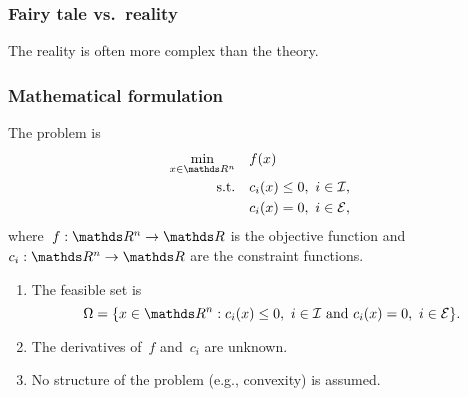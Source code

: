 \documentclass{polyu-presentation}
\newcommand{\con}[1]{c_{#1}}
\newcommand{\ieq}{\mathcal{E}}
\newcommand{\iub}{\mathcal{I}}
\newcommand{\obj}{f}
\begin{document}
\begin{frame}
    \frametitle{Fairy tale vs.\ reality}

    \alert<2>{The reality} is often more complex than \alert<1>{the theory}.

    \bigskip
    
    \begin{center}
    \end{center}
\end{frame}

\begin{frame}
    \frametitle{Mathematical formulation}

    The problem is
    \begin{align*}
        \min_{x \in \R^n}   & \quad \obj(x)\\
        \text{s.t.}         & \quad \con{i}(x) \le 0, ~ i \in \iub,\\
                            & \quad \con{i}(x) = 0, ~ i \in \ieq,
    \end{align*}
    where~$\obj : \R^n \to \R$ is the \alert{objective function} and~$\con{i} : \R^n \to \R$ are the \alert{constraint functions}.

    \smallskip

    \begin{block}{}
        \begin{enumerate}
            \item The \alert{feasible set} is
            \begin{equation*}
                \Omega = \set{x \in \R^n : \con{i}(x) \le 0, ~ i \in \iub ~ \mathrm{and} ~ \con{i}(x) = 0, ~ i \in \ieq}.
            \end{equation*}
            \item The derivatives of~$\obj$ and~$\con{i}$ are \alert{unknown}.
            \item \alert{No structure} of the problem (e.g., convexity) is assumed.
        \end{enumerate}
    \end{block}
\end{frame}
\end{document}
